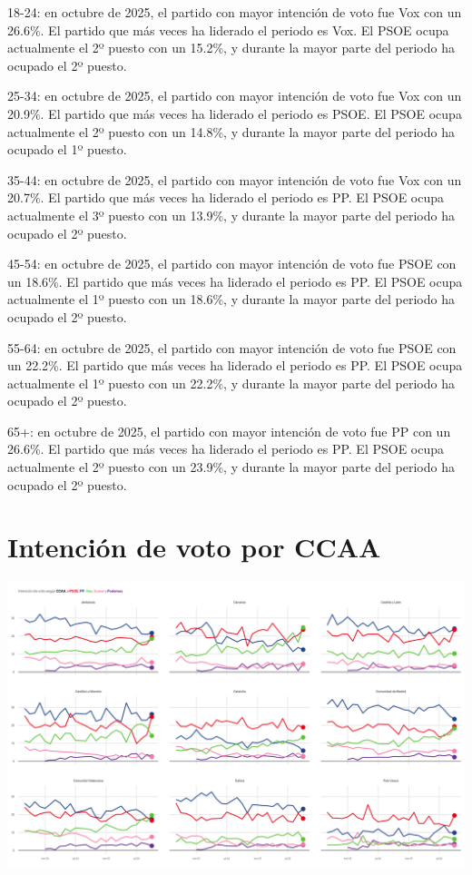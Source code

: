 \documentclass[
  letterpaper,
  DIV=11,
  numbers=noendperiod]{scrreprt}
\begin{document}
18-24: en octubre de 2025, el partido con mayor intención de voto fue
Vox con un 26.6\%. El partido que más veces ha liderado el periodo es
Vox. El PSOE ocupa actualmente el 2º puesto con un 15.2\%, y durante la
mayor parte del periodo ha ocupado el 2º puesto.

25-34: en octubre de 2025, el partido con mayor intención de voto fue
Vox con un 20.9\%. El partido que más veces ha liderado el periodo es
PSOE. El PSOE ocupa actualmente el 2º puesto con un 14.8\%, y durante la
mayor parte del periodo ha ocupado el 1º puesto.

35-44: en octubre de 2025, el partido con mayor intención de voto fue
Vox con un 20.7\%. El partido que más veces ha liderado el periodo es
PP. El PSOE ocupa actualmente el 3º puesto con un 13.9\%, y durante la
mayor parte del periodo ha ocupado el 2º puesto.

45-54: en octubre de 2025, el partido con mayor intención de voto fue
PSOE con un 18.6\%. El partido que más veces ha liderado el periodo es
PP. El PSOE ocupa actualmente el 1º puesto con un 18.6\%, y durante la
mayor parte del periodo ha ocupado el 2º puesto.

55-64: en octubre de 2025, el partido con mayor intención de voto fue
PSOE con un 22.2\%. El partido que más veces ha liderado el periodo es
PP. El PSOE ocupa actualmente el 1º puesto con un 22.2\%, y durante la
mayor parte del periodo ha ocupado el 2º puesto.

65+: en octubre de 2025, el partido con mayor intención de voto fue PP
con un 26.6\%. El partido que más veces ha liderado el periodo es PP. El
PSOE ocupa actualmente el 2º puesto con un 23.9\%, y durante la mayor
parte del periodo ha ocupado el 2º puesto.

\chapter{Intención de voto por
CCAA}\label{intenciuxf3n-de-voto-por-ccaa}

\includegraphics[width=8in,height=\textheight,keepaspectratio]{figures/p_idv_ccaa_static.png}
\end{document}
